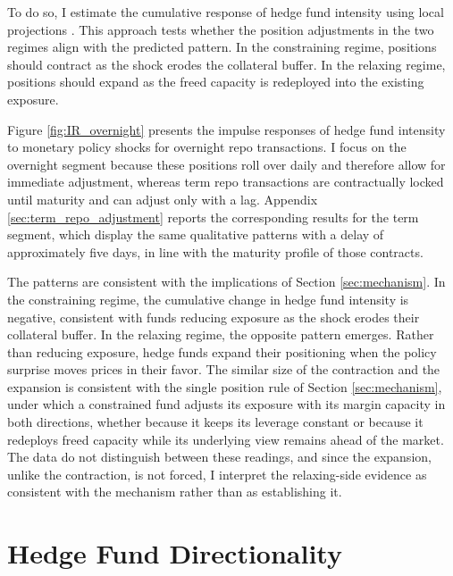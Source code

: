 \documentclass[english, 11pt, oneside]{article}
\begin{document}
To do so, I estimate the cumulative response of hedge fund intensity using local projections \citep{jorda2005}. This approach tests whether the position adjustments in the two regimes align with the predicted pattern. In the constraining regime, positions should contract as the shock erodes the collateral buffer. In the relaxing regime, positions should expand as the freed capacity is redeployed into the existing exposure.

Figure \ref{fig:IR_overnight} presents the impulse responses of hedge fund intensity to monetary policy shocks for overnight repo transactions. I focus on the overnight segment because these positions roll over daily and therefore allow for immediate adjustment, whereas term repo transactions are contractually locked until maturity and can adjust only with a lag. Appendix \ref{sec:term_repo_adjustment} reports the corresponding results for the term segment, which display the same qualitative patterns with a delay of approximately five days, in line with the maturity profile of those contracts.

The patterns are consistent with the implications of Section \ref{sec:mechanism}. In the constraining regime, the cumulative change in hedge fund intensity is negative, consistent with funds reducing exposure as the shock erodes their collateral buffer. In the relaxing regime, the opposite pattern emerges. Rather than reducing exposure, hedge funds expand their positioning when the policy surprise moves prices in their favor. The similar size of the contraction and the expansion is consistent with the single position rule of Section \ref{sec:mechanism}, under which a constrained fund adjusts its exposure with its margin capacity in both directions, whether because it keeps its leverage constant \citep{adrian2014} or because it redeploys freed capacity while its underlying view remains ahead of the market. The data do not distinguish between these readings, and since the expansion, unlike the contraction, is not forced, I interpret the relaxing-side evidence as consistent with the mechanism rather than as establishing it.

\section{Hedge Fund Directionality}
\label{sec:directionality}
\end{document}
